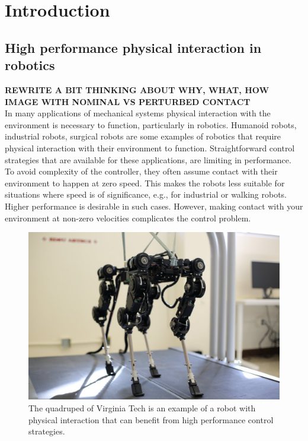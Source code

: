 \documentclass[../DC2017114Bouma.tex]{subfiles}
\begin{document}
\graphicspath{{01_Introduction/img/}}
\renewcommand{\chaptermark}[1]{\markboth{\thechapter.\ #1}{}}
\renewcommand{\sectionmark}[1]{\markright{#1}{}}
\cleartooddpage
\pagestyle{fancyreport}

\chapter{Introduction}
\section{High performance physical interaction in robotics}
\textbf{REWRITE A BIT THINKING ABOUT WHY, WHAT, HOW}\\
\textbf{IMAGE WITH NOMINAL VS PERTURBED CONTACT}\\
In many applications of mechanical systems physical interaction with the environment is necessary to function, particularly in robotics. Humanoid robots, industrial robots, surgical robots are some examples of robotics that require physical interaction with their environment to function. Straightforward control strategies that are available for these applications, are limiting in performance. To avoid complexity of the controller, they often assume contact with their environment to happen at zero speed. This makes the robots less suitable for situations where speed is of significance, e.g., for industrial or walking robots. Higher performance is desirable in such cases. However, making contact with your environment at non-zero velocities complicates the control problem.

\begin{figure}[H]
\centering
\includegraphics[width=.5\textwidth]{quadruped.jpg}\caption{The quadruped of Virginia Tech is an example of a robot with physical interaction that can benefit from high performance control strategies.}\label{fig:quadrupedVT}
\end{figure}
\end{document}
